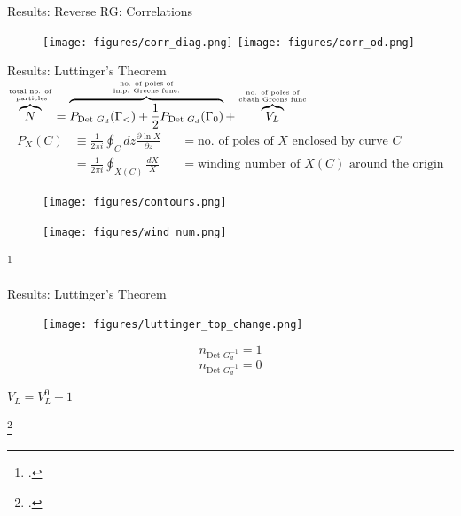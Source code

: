 \documentclass[aspectratio=169]{beamer}
\newcommand{\cen}[1]{\begin{center}{#1}\end{center}}
\begin{document}
\begin{frame}[noframenumbering]{Results: Reverse RG: Correlations}
	\begin{figure}[htpb]
		\centering
		\texttt{[image: figures/corr\_diag.png]}\hspace*{\fill}
		\texttt{[image: figures/corr\_od.png]}
	\end{figure}
\end{frame}

\begin{frame}[noframenumbering]{Results: Luttinger's Theorem}
	\hspace*{\fill}	{\Large \(\overbrace{N}^{\text{total no. of}\atop{\text{ particles}}} = \overbrace{P_{\text{Det }G_d}(\Gamma_<) + \frac{1}{2}P_{\text{Det }G_d}(\Gamma_0)}^{\text{no. of poles of}\atop{\text{imp. Greens func.}}} + \overbrace{V_L}^{\text{no. of poles of}\atop{\text{cbath Greens func}}}\)}\hspace*{\fill}
\begin{equation*}\begin{aligned}
	P_X(C) &\equiv \frac{1}{2\pi i}\oint_C dz \frac{\partial{\ln X}}{\partial{z}} &&=\text{no. of poles of } X \text{ enclosed by curve }C \\
	       &= \frac{1}{2\pi i}\oint_{X(C)} \frac{dX}{X} &&= \text{winding number of } X(C) \text{ around the origin}
\end{aligned}\end{equation*}
\begin{minipage}{0.4\textwidth}
	\begin{figure}[htpb]
		\centering
		\texttt{[image: figures/contours.png]}
	\end{figure}
\end{minipage}
\hspace*{0.15\textwidth}
\begin{minipage}{0.4\textwidth}
	\begin{figure}[htpb]
		\centering
		\texttt{[image: figures/wind\_num.png]}
	\end{figure}
\end{minipage}
\footcite{seki}
\end{frame}

\begin{frame}[noframenumbering]{Results: Luttinger's Theorem}
\begin{minipage}{0.6\textwidth}
\begin{figure}[htpb]
	\centering
	\texttt{[image: figures/luttinger\_top\_change.png]}
\end{figure}
\end{minipage}
\begin{minipage}{0.39\textwidth}
	\vspace*{5pt}
		{\large \[n_{\text{Det }G_d^{-1}} = 1\]
	\vspace*{45pt}
\[n_{\text{Det }G_d^{-1}} = 0\]}
\end{minipage}
\vspace*{10pt}
\cen{
	\Large
	\(V_L = V_L^0 + 1\)
}

\footcite{martin}
\end{frame}
\end{document}
